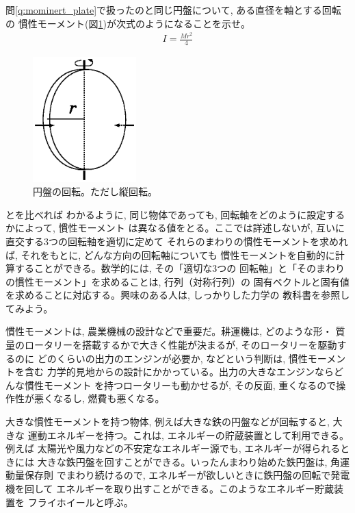 \begin{q}\label{q:mominert_diameter}
問\ref{q:mominert_plate}で扱ったのと同じ円盤について, ある直径を軸とする回転の
慣性モーメント(図\ref{fig:disk6})が次式のようになることを示せ。
\begin{eqnarray}
I=\frac{Mr^2}{4}\label{eq:mominert_disc_diameter}
\end{eqnarray}
\begin{figure}[h]
    \centering
    \includegraphics[width=4cm]{disk6.eps}
    \caption{円盤の回転。ただし縦回転。}\label{fig:disk6}
\end{figure}
\end{q}

とを比べれば
わかるように, 同じ物体であっても, 回転軸をどのように設定するかによって, 慣性モーメント
は異なる値をとる。ここでは詳述しないが, 互いに直交する3つの回転軸を適切に定めて
それらのまわりの慣性モーメントを求めれば, それをもとに, どんな方向の回転軸についても
慣性モーメントを自動的に計算することができる。数学的には, その「適切な3つの
回転軸」と「そのまわりの慣性モーメント」を求めることは, 行列（対称行列）の
固有ベクトルと固有値を求めることに対応する。興味のある人は, しっかりした力学の
教科書を参照してみよう。\mv

慣性モーメントは, 農業機械の設計などで重要だ。耕運機は, どのような形・
質量のロータリーを搭載するかで大きく性能が決まるが, そのロータリーを駆動するのに
どのくらいの出力のエンジンが必要か, などという判断は, 慣性モーメントを含む
力学的見地からの設計にかかっている。出力の大きなエンジンならどんな慣性モーメント
を持つロータリーも動かせるが, その反面, 重くなるので操作性が悪くなるし, 
燃費も悪くなる。

大きな慣性モーメントを持つ物体, 例えば大きな鉄の円盤などが回転すると, 大きな
運動エネルギーを持つ。これは, エネルギーの貯蔵装置として利用できる。例えば
太陽光や風力などの不安定なエネルギー源でも, エネルギーが得られるときには
大きな鉄円盤を回すことができる。いったんまわり始めた鉄円盤は, 角運動量保存則
でまわり続けるので, エネルギーが欲しいときに鉄円盤の回転で発電機を回して
エネルギーを取り出すことができる。このようなエネルギー貯蔵装置を
フライホイールと呼ぶ。\mv

